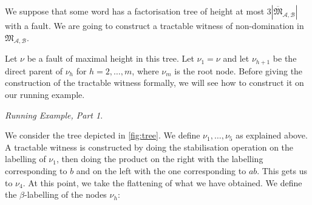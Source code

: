 \documentclass[10pt,a4paper]{amsart}
\theoremstyle{definition}
\numberwithin{equation}{section}
\theoremstyle{remark}
\newcommand{\ideal}{\mathfrak{M}}
\newcommand{\autA}{\mathcal{A}}
\newcommand{\autB}{\mathcal{B}}
\theoremstyle{remark}
\newtheorem{runningexample/}{Running Example, Part}
\newenvironment{runningexample}
  {\renewcommand{\qedsymbol}{\color{darkgray}\ensuremath{\lrcorner}}%
   \pushQED{\qed}\begin{runningexample/}}
  {\popQED\end{runningexample/}}
\begin{document}
We suppose that some word has a factorisation tree of height at most $3|\overline{\ideal}_{\autA,\autB}|$ with a fault. We are going to construct a tractable witness of non-domination in $\ideal_{\autA,\autB}$.

Let $\nu$ be a fault of maximal height in this tree. Let $\nu_1 = \nu$ and let $\nu_{h+1}$ be the direct parent of $\nu_h$ for $h=2,\dots,m$, where $\nu_m$ is the root node. Before giving the construction of the tractable witness formally, we will see how to construct it on our running example.

\begin{runningexample}\label{runningeg:constructingawitnessfromfault}

We consider the tree depicted in \cref{fig:tree}. We define $\nu_1, \ldots, \nu_5$ as explained above. A tractable witness is constructed by doing the stabilisation operation on the labelling of $\nu_1$, then doing the product on the right with the labelling corresponding to $b$ and on the left with the one corresponding to $ab$. This gets us to $\nu_4$. At this point, we take the flattening of what we have obtained. We define the $\beta$-labelling of the nodes $\nu_h$:


\end{runningexample}
\end{document}
